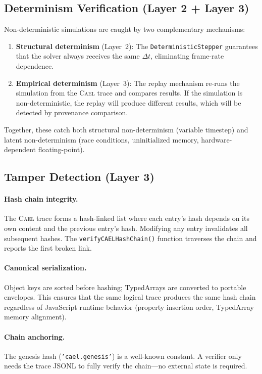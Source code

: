 \documentclass[letterpaper,twocolumn,10pt]{article}
\newcommand{\cael}{\textsc{Cael}}
\begin{document}
\subsection{Determinism Verification (Layer 2 + Layer 3)}

Non-deterministic simulations are caught by two complementary
mechanisms:

\begin{enumerate}[leftmargin=*,topsep=2pt,itemsep=1pt]
  \item \textbf{Structural determinism} (Layer~2): The
    \texttt{DeterministicStepper} guarantees that the solver
    always receives the same $\Delta t$, eliminating frame-rate
    dependence.
  \item \textbf{Empirical determinism} (Layer~3): The replay
    mechanism re-runs the simulation from the \cael{} trace and
    compares results. If the simulation is non-deterministic, the
    replay will produce different results, which will be detected
    by provenance comparison.
\end{enumerate}

Together, these catch both structural non-determinism (variable
timestep) and latent non-determinism (race conditions, uninitialized
memory, hardware-dependent floating-point).

\subsection{Tamper Detection (Layer 3)}

\paragraph{Hash chain integrity.} The \cael{} trace forms a
hash-linked list where each entry's hash depends on its own content
and the previous entry's hash. Modifying any entry invalidates all
subsequent hashes. The \texttt{verifyCAELHashChain()} function
traverses the chain and reports the first broken link.

\paragraph{Canonical serialization.} Object keys are sorted before
hashing; TypedArrays are converted to portable envelopes. This
ensures that the same logical trace produces the same hash chain
regardless of JavaScript runtime behavior (property insertion order,
TypedArray memory alignment).

\paragraph{Chain anchoring.} The genesis hash (\texttt{'cael.genesis'})
is a well-known constant. A verifier only needs the trace JSONL to
fully verify the chain---no external state is required.
\end{document}
